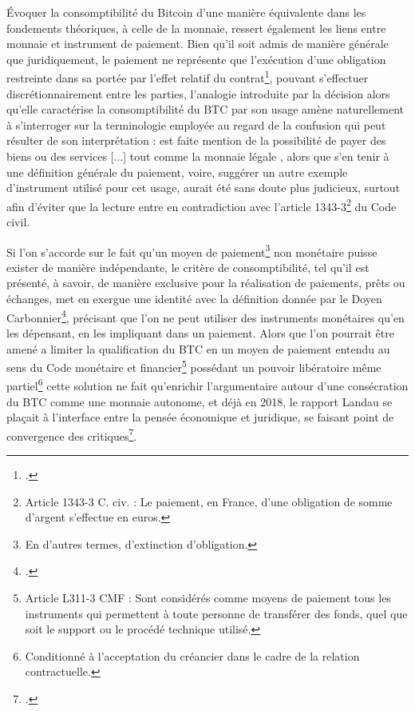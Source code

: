 {Évoquer la consomptibilité du Bitcoin d'une manière équivalente dans les fondements théoriques, à celle de la monnaie, ressert également les liens entre monnaie et instrument de paiement. Bien qu'il soit admis de manière générale que juridiquement, le paiement ne représente que l'exécution d'une obligation restreinte dans sa portée par l'effet relatif du contrat\footnote{.}, pouvant s'effectuer discrétionnairement entre les parties, l'analogie introduite par la décision alors qu'elle caractérise la consomptibilité du BTC par son usage amène naturellement à s'interroger sur la terminologie employée au regard de la confusion qui peut résulter de son interprétation : est faite mention de la possibilité de \og payer des biens ou des services [...] tout comme la monnaie légale \fg{}, alors que s'en tenir à une définition générale du paiement, voire, suggérer un autre exemple d'instrument utilisé pour cet usage, aurait été sans doute plus judicieux, surtout afin d'éviter que la lecture entre en contradiction avec l'article 1343-3\footnote{Article 1343-3 C. civ. : Le paiement, en France, d'une obligation de somme d'argent s'effectue en euros.} du Code civil.\par

Si l'on s'accorde sur le fait qu'un moyen de paiement\footnote{En d'autres termes, d'extinction d'obligation.} non monétaire puisse exister de manière indépendante, le critère de consomptibilité, tel qu'il est présenté, à savoir, de manière exclusive pour la réalisation de paiements, prêts ou échanges, met en exergue une identité avec la définition donnée par le Doyen Carbonnier\footnote{.}, précisant que l'on \og ne peut utiliser des instruments monétaires qu'en les dépensant, en les impliquant dans un paiement\fg{}. Alors que l'on pourrait être amené a limiter la qualification du BTC en un moyen de paiement entendu au sens du Code monétaire et financier\footnote{Article L311-3 CMF : Sont considérés comme moyens de paiement tous les instruments qui permettent à toute personne de transférer des fonds, quel que soit le support ou le procédé technique utilisé.} possédant un pouvoir libératoire même partiel\footnote{Conditionné à l'acceptation du créancier dans le cadre de la relation contractuelle.} cette solution ne fait qu'enrichir l'argumentaire autour d'une consécration du BTC comme une monnaie autonome, et déjà en 2018, le rapport Landau se plaçait à l'interface entre la pensée économique et juridique, se faisant point de convergence des critiques\footnote{.}.\par

}
